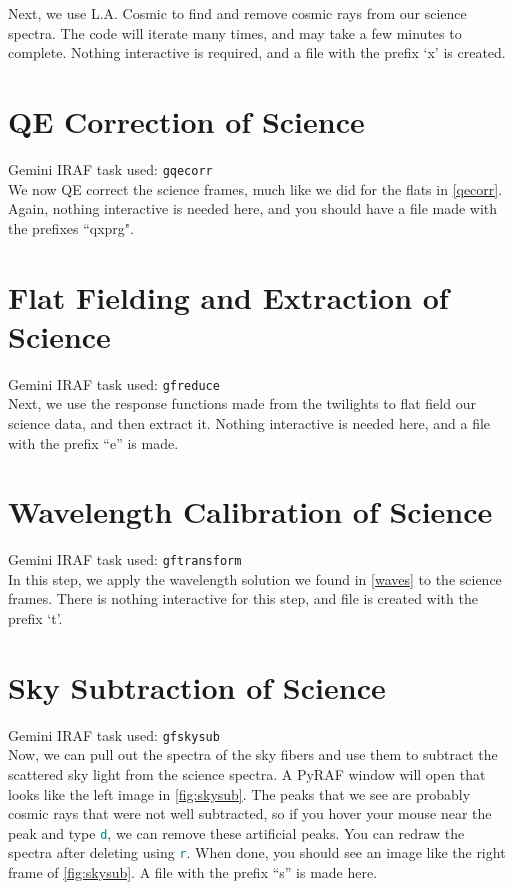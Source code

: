 \documentclass[12pt]{report}
\newcommand{\ty}[1]{\textcolor{teal}{\texttt{#1}}}
\begin{document}
\noindent Next, we use L.A. Cosmic to find and remove cosmic rays from our science spectra. The code will iterate many times, and may take a few minutes to complete. Nothing interactive is required, and a file with the prefix `x' is created.

\section{QE Correction of Science}

\noindent Gemini IRAF task used: \texttt{gqecorr}\\

\noindent We now QE correct the science frames, much like we did for the flats in \autoref{qecorr}. Again, nothing interactive is needed here, and you should have a file made with the prefixes ``qxprg".

\section{Flat Fielding and Extraction of Science}

\noindent Gemini IRAF task used: \texttt{gfreduce}\\

\noindent Next, we use the response functions made from the twilights to flat field our science data, and then extract it. Nothing interactive is needed here, and a file with the prefix ``e'' is made.

\section{Wavelength Calibration of Science}

\noindent Gemini IRAF task used: \texttt{gftransform}\\

\noindent In this step, we apply the wavelength solution we found in \autoref{waves} to the science frames. There is nothing interactive for this step, and file is created with the prefix `t'.

\section{Sky Subtraction of Science}

\noindent Gemini IRAF task used: \texttt{gfskysub}\\

\noindent Now, we can pull out the spectra of the sky fibers and use them to subtract the scattered sky light from the science spectra. A PyRAF window will open that looks like the left image in \autoref{fig:skysub}. The peaks that we see are probably cosmic rays that were not well subtracted, so if you hover your mouse near the peak and type \ty{d}, we can remove these artificial peaks. You can redraw the spectra after deleting using \ty{r}. When done, you should see an image like the right frame of \autoref{fig:skysub}. A file with the prefix ``s'' is made here.
\end{document}
